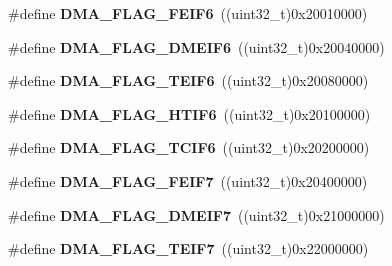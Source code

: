 \begin{DoxyCompactItemize}
\item 
\hypertarget{group___d_m_a__flags__definition_gafc0383aab975f70507f76e983c32b8c0}{\#define {\bfseries D\-M\-A\-\_\-\-F\-L\-A\-G\-\_\-\-F\-E\-I\-F6}~((uint32\-\_\-t)0x20010000)}\label{group___d_m_a__flags__definition_gafc0383aab975f70507f76e983c32b8c0}

\item 
\hypertarget{group___d_m_a__flags__definition_ga1d85ff6756ffbd8284ac435f3781eb4a}{\#define {\bfseries D\-M\-A\-\_\-\-F\-L\-A\-G\-\_\-\-D\-M\-E\-I\-F6}~((uint32\-\_\-t)0x20040000)}\label{group___d_m_a__flags__definition_ga1d85ff6756ffbd8284ac435f3781eb4a}

\item 
\hypertarget{group___d_m_a__flags__definition_ga2900d2ad700dffbb058b238162018be0}{\#define {\bfseries D\-M\-A\-\_\-\-F\-L\-A\-G\-\_\-\-T\-E\-I\-F6}~((uint32\-\_\-t)0x20080000)}\label{group___d_m_a__flags__definition_ga2900d2ad700dffbb058b238162018be0}

\item 
\hypertarget{group___d_m_a__flags__definition_gaa2e5cb8680883513cf8fccef6c39c78e}{\#define {\bfseries D\-M\-A\-\_\-\-F\-L\-A\-G\-\_\-\-H\-T\-I\-F6}~((uint32\-\_\-t)0x20100000)}\label{group___d_m_a__flags__definition_gaa2e5cb8680883513cf8fccef6c39c78e}

\item 
\hypertarget{group___d_m_a__flags__definition_ga7b16e37ffcf292fcab6745af7de1e50c}{\#define {\bfseries D\-M\-A\-\_\-\-F\-L\-A\-G\-\_\-\-T\-C\-I\-F6}~((uint32\-\_\-t)0x20200000)}\label{group___d_m_a__flags__definition_ga7b16e37ffcf292fcab6745af7de1e50c}

\item 
\hypertarget{group___d_m_a__flags__definition_ga4c75ab8fa2339bad9413f133ec9b92d3}{\#define {\bfseries D\-M\-A\-\_\-\-F\-L\-A\-G\-\_\-\-F\-E\-I\-F7}~((uint32\-\_\-t)0x20400000)}\label{group___d_m_a__flags__definition_ga4c75ab8fa2339bad9413f133ec9b92d3}

\item 
\hypertarget{group___d_m_a__flags__definition_gae8b9016059eef77580e3845d30c1f42f}{\#define {\bfseries D\-M\-A\-\_\-\-F\-L\-A\-G\-\_\-\-D\-M\-E\-I\-F7}~((uint32\-\_\-t)0x21000000)}\label{group___d_m_a__flags__definition_gae8b9016059eef77580e3845d30c1f42f}

\item 
\hypertarget{group___d_m_a__flags__definition_ga4f4acb7f0b6c46a1af27733852ef4fc7}{\#define {\bfseries D\-M\-A\-\_\-\-F\-L\-A\-G\-\_\-\-T\-E\-I\-F7}~((uint32\-\_\-t)0x22000000)}\label{group___d_m_a__flags__definition_ga4f4acb7f0b6c46a1af27733852ef4fc7}


\end{DoxyCompactItemize}
